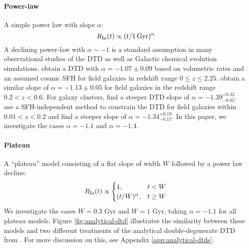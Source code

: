 \documentclass[twocolumn,twocolappendix,linenumbers,trackchanges]{aastex631}
\begin{document}
\paragraph{Power-law} A simple power law with slope $\alpha$:
\begin{equation}
    R_{\rm Ia}(t) \propto (t/1\,\rm{Gyr})^\alpha
    \label{eq:powerlaw-dtd}
\end{equation}
A declining power-law with $\alpha\sim-1$ is a standard assumption in many observational studies of the DTD as well as Galactic chemical evolution simulations. \citet{Maoz2017-CosmicDTD} obtain a DTD with $\alpha=-1.07\pm0.09$ based on volumetric rates and an assumed cosmic SFH for field galaxies in redshift range $0\leq z\leq 2.25$. \citet{Wiseman2021-DESRates} obtain a similar slope of $\alpha=-1.13\pm0.05$ for field galaxies in the redshift range $0.2<z<0.6$. For galaxy clusters, \citet{Maoz2017-CosmicDTD} find a steeper DTD slope of $\alpha=-1.39^{+0.32}_{-0.05}$. \citet{Heringer2019-FieldGalaxyDTD} use a SFH-independent method to constrain the DTD for field galaxies within $0.01<z<0.2$ and find a steeper slope of $\alpha=-1.34^{+0.19}_{-0.17}$.
In this paper, we investigate the cases $\alpha=-1.1$ and $\alpha=-1.4$.

\paragraph{Plateau} A ``plateau'' model consisting of a flat slope of width $W$ followed by a power law decline:
\begin{equation}
    R_{\rm Ia}(t) \propto
    \begin{cases}
        1, & t < W \\
        (t/W)^\alpha, & t \ge W
    \end{cases}
    \label{eq:plateau-dtd}
\end{equation}
We investigate the cases $W=0.3$ Gyr and $W=1$ Gyr, taking $\alpha=-1.1$ for all plateau models. Figure \ref{fig:analytical-dtd} illustrates the similarity between these models and two different treatments of the analytical double-degenerate DTD from \citet{Greggio2005-AnalyticalRates}. For more discussion on this, see Appendix \ref{app:analytical-dtds}.
\end{document}
